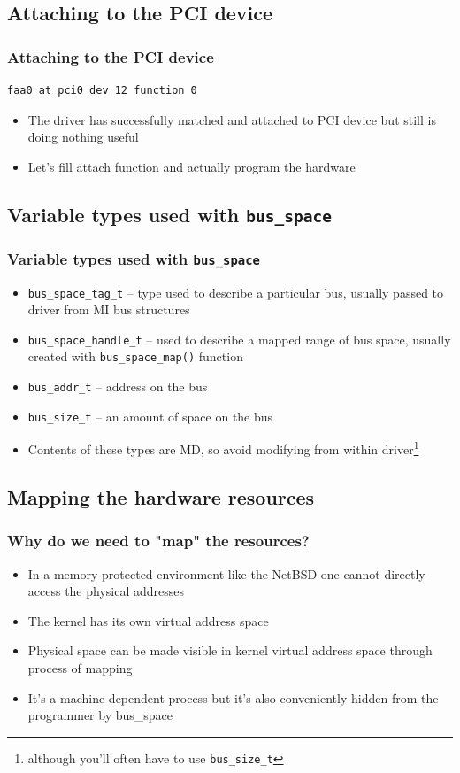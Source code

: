 \documentclass[dvipsnames,table]{beamer}
\begin{document}
\subsection{Attaching to the PCI device}

\begin{frame}[fragile]
\frametitle{Attaching to the PCI device}
\begin{verbatim}
faa0 at pci0 dev 12 function 0
\end{verbatim}
\begin{itemize}
	\item The driver has successfully matched and attached to PCI device but still is doing nothing useful
	\item Let's fill attach function and actually program the hardware
\end{itemize}
\end{frame}

\subsection{Variable types used with {\tt bus\_space}}

\begin{frame}
\frametitle{Variable types used with {\tt bus\_space}}

\begin{itemize}
         \item {\tt bus\_space\_tag\_t} -- type used to describe a particular bus, usually passed to driver from MI bus structures
         \item {\tt bus\_space\_handle\_t} --  used to describe a mapped range of bus space, usually created with {\tt bus\_space\_map()} function
         \item {\tt bus\_addr\_t} -- address on the bus
         \item {\tt bus\_size\_t} -- an amount of space on the bus
         \item Contents of these types are MD, so avoid modifying from within driver\footnote{although you'll often have to use {\tt bus\_size\_t}}
\end{itemize}
\end{frame}


\subsection{Mapping the hardware resources}

\begin{frame}
\frametitle{Why do we need to "map" the resources?}
\begin{itemize}
	\item In a memory-protected environment like the NetBSD one cannot directly access the physical addresses
	\item The kernel has its own virtual address space
    \item Physical space can be made visible in kernel virtual address space through process of mapping
    \item It's a machine-dependent process but it's also conveniently hidden from the programmer by bus\_space
\end{itemize}
\end{frame}
\end{document}
